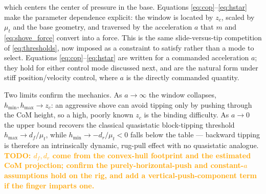 \documentclass[10pt, conference]{IEEEtran}
\newcommand{\todo}[1]{\textcolor{orange}{\textbf{TODO: #1}}}
\begin{document}
which centers the center of pressure in the base. Equations \eqref{eq:cop}--\eqref{eq:hstar} make the parameter dependence explicit: the window is located by $z_c$, scaled by $\mu_t$ and the base geometry, and traversed by the acceleration $a$ that $m$ and \eqref{eq:shove_force} convert into a force. This is the same slide-versus-tip competition of \eqref{eq:thresholds}, now imposed as a constraint to satisfy rather than a mode to select. Equations \eqref{eq:cop}--\eqref{eq:hstar} are written for a commanded acceleration $a$; they hold for either control mode discussed next, and are the natural form under stiff position/velocity control, where $a$ is the directly commanded quantity.

Two limits confirm the mechanics. As $a \to \infty$ the window collapses, $h_{\min}, h_{\max} \to z_c$: an aggressive shove can avoid tipping only by pushing through the CoM height, so a high, poorly known $z_c$ is the binding difficulty. As $a \to 0$ the upper bound recovers the classical quasistatic block-tipping threshold $h_{\max} \to d_f/\mu_t$, while $h_{\min} \to -d_r/\mu_t < 0$ falls below the table --- backward tipping is therefore an intrinsically dynamic, rug-pull effect with no quasistatic analogue. \todo{$d_f, d_r$ come from the convex-hull footprint and the estimated CoM projection; confirm the purely-horizontal-push and constant-$a$ assumptions hold on the rig, and add a vertical-push-component term if the finger imparts one.}
\end{document}
